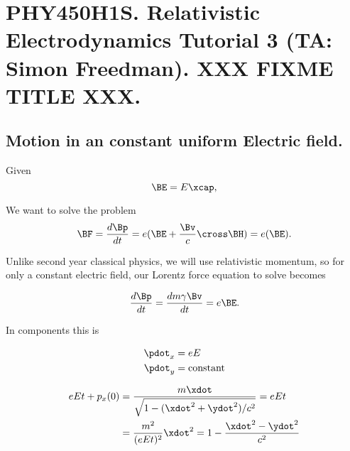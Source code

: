 
%

\chapter{PHY450H1S.  Relativistic Electrodynamics Tutorial 3 (TA: Simon Freedman).  XXX FIXME TITLE XXX.}
\label{chap:relativisticElectrodynamicsT3}
{}
\date{Feb 3, 2011}

\beginArtWithToc

\section{Motion in an constant uniform Electric field.}

Given
\begin{equation}\label{eqn:relativisticElectrodynamicsT3:n}
\BE = E \xcap,
\end{equation}

We want to solve the problem
\begin{equation}\label{eqn:relativisticElectrodynamicsT3:n}
\BF = \frac{d\Bp}{dt} =
e ( \BE + \frac{\Bv}{c} \cross \BH ) = e ( \BE ).
\end{equation}

Unlike second year classical physics, we will use relativistic momentum, so for only a constant electric field, our Lorentz force equation to solve becomes

\begin{equation}\label{eqn:relativisticElectrodynamicsT3:n}
\frac{d\Bp}{dt} = \frac{d m \gamma \Bv}{dt} = e \BE.
\end{equation}

In components this is

\begin{align}\label{eqn:relativisticElectrodynamicsT3:n}
\pdot_x &= e E \\
\pdot_y &= \text{constant}
\end{align}

\begin{align*}
e E t + p_x(0)
&=
\frac{m \xdot}{\sqrt{1 - (\xdot^2 + \ydot^2)/c^2}} = e E t \\
&= 
\frac{m^2}{(e E t)^2} \xdot^2 = 1 - \frac{\xdot^2 - \ydot^2}{c^2}
\end{align*}

